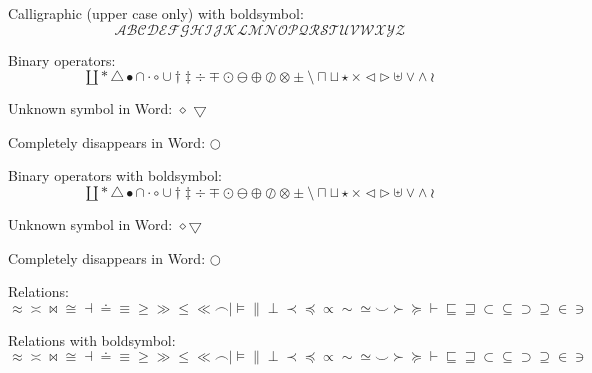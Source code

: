 \documentclass[12pt,a4paper]{article}
\theoremstyle{clearprint}
\begin{document}
\noindent
Calligraphic (upper case only) with boldsymbol:
\begin{equation}
\boldsymbol{\mathcal{A}  \mathcal{B}  \mathcal{C}  \mathcal{D}  \mathcal{E}  \mathcal{F}  \mathcal{G}  \mathcal{H}  \mathcal{I}  \mathcal{J}  \mathcal{K}  \mathcal{L}  \mathcal{M}  \mathcal{N}  \mathcal{O}  \mathcal{P}  \mathcal{Q}  \mathcal{R}  \mathcal{S}  \mathcal{T}  \mathcal{U}  \mathcal{V}  \mathcal{W}  \mathcal{X}  \mathcal{Y}  \mathcal{Z}}
\end{equation}

\noindent 
Binary operators: %
\begin{equation}
\amalg \ast \bigtriangleup \bullet \cap \cdot \circ \cup \dagger \ddagger \div \mp \odot \ominus \oplus \oslash \otimes \pm \setminus \sqcap \sqcup \star \times \triangleleft \triangleright \uplus \vee \wedge \wr
\end{equation}

Unknown symbol in Word: $\diamond$ $\bigtriangledown$

Completely disappears in Word: $\bigcirc$

\noindent 
Binary operators with boldsymbol:
\begin{equation}
\boldsymbol{\amalg \ast \bigtriangleup \bullet \cap \cdot \circ \cup \dagger \ddagger \div \mp \odot \ominus \oplus \oslash \otimes \pm \setminus \sqcap \sqcup \star \times \triangleleft \triangleright \uplus \vee \wedge \wr}
\end{equation}

Unknown symbol in Word: $\boldsymbol{\diamond \bigtriangledown}$

Completely disappears in Word: $\boldsymbol{\bigcirc}$

\noindent 
Relations: %
\begin{equation}
\approx \asymp \bowtie \cong \dashv \doteq \equiv \geq \gg \leq \ll \frown \mid \models \parallel \perp \prec \preceq \propto \sim \simeq \smile \succ \succeq \vdash
\sqsubseteq \sqsupseteq \subset \subseteq \supset \supseteq \in \ni
\end{equation}

\noindent 
Relations with boldsymbol:
\begin{equation}
\boldsymbol{\approx \asymp \bowtie \cong \dashv \doteq \equiv \geq \gg \leq \ll \frown \mid \models \parallel \perp \prec \preceq \propto \sim \simeq \smile \succ \succeq \vdash
\sqsubseteq \sqsupseteq \subset \subseteq \supset \supseteq \in \ni
}
\end{equation}
\end{document}
